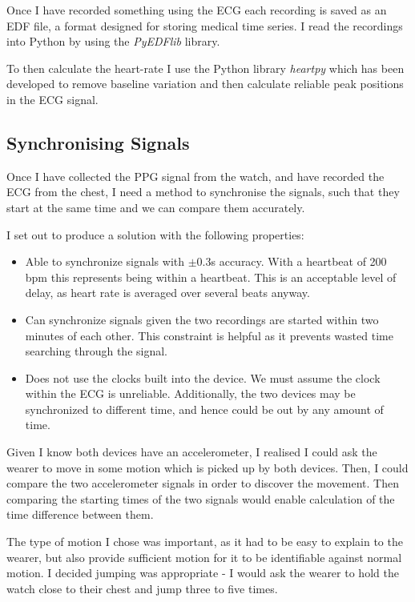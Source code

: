 \documentclass[12pt,a4paper,twoside,openright]{report}
\begin{document}
Once I have recorded something using the ECG 
each recording is saved as an EDF file, a format
designed for storing medical time series. I read the recordings into Python
by using the \emph{PyEDFlib} library.

To then calculate the heart-rate I use the Python library \emph{heartpy} which
has been developed to remove baseline variation and then calculate reliable
peak positions in the ECG signal.

\subsection{Synchronising Signals} \label{sec:sync}

Once I have collected the PPG signal from the watch, and have recorded the ECG
from the chest, I need a method to synchronise the signals, such that they
start at the same time and we can compare them accurately.

I set out to produce a solution with the following properties:
\begin{itemize}
	\item Able to synchronize signals with \(\pm0.3\)s accuracy. With a
		heartbeat of 200 bpm this represents being within a heartbeat.
		This is an acceptable level of delay, as heart rate is
		averaged over several beats anyway.

	\item Can synchronize signals given the two recordings are started
		within two minutes of each other. This constraint is helpful
		as it prevents wasted time searching through the signal.

	\item Does not use the clocks built into the device. We must assume
		the clock within the ECG is unreliable. Additionally, the two
		devices may be synchronized to different time, and hence could
		be out by any amount of time.
\end{itemize}

Given I know both devices have an accelerometer, I realised I could ask the
wearer to move in some motion which is picked up by both devices. Then, I
could compare the two accelerometer signals in order to discover the
movement. Then comparing the starting times of the two signals would enable
calculation of the time difference between them.

The type of motion I chose was important, as it had to be easy to explain to
the wearer, but also provide sufficient motion for it to be identifiable
against normal motion. I decided jumping was appropriate -
I would ask the wearer to hold the watch close to their chest and jump three
to five times.
\end{document}
